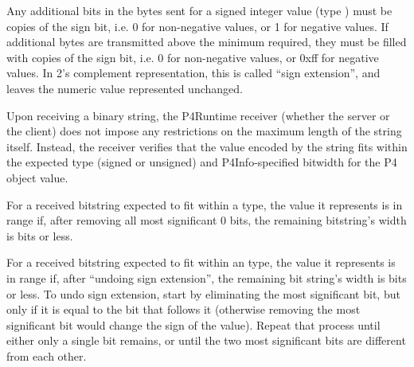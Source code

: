 \documentclass[11pt]{article}
\begin{document}
{%
Any additional bits in the bytes sent for a signed integer value (type )
must be copies of the sign bit, i.e. 0 for non-negative values, or 1 for
negative values. If additional bytes are transmitted above the
 minimum required, they must be filled with copies of the
sign bit, i.e. 0 for non-negative values, or 0xff for negative values. In 2's
complement representation, this is called \textquotedblleft{}sign extension\textquotedblright{}, and leaves the
numeric value represented unchanged.%

Upon receiving a binary string, the P4Runtime receiver (whether the server or
the client) does not impose any restrictions on the maximum length of the string
itself. Instead, the receiver verifies that the value encoded by the string fits
within the expected type (signed or unsigned) and P4Info-specified bitwidth for
the P4 object value.%

For a received bitstring expected to fit within a  type, the value it
represents is in range if, after removing all most significant 0 bits, the
remaining bitstring's width is  bits or less.%

For a received bitstring expected to fit within an  type, the value it
represents is in range if, after \textquotedblleft{}undoing sign extension\textquotedblright{}, the remaining bit
string's width is  bits or less. To undo sign extension, start by eliminating
the most significant bit, but only if it is equal to the bit that follows it
(otherwise removing the most significant bit would change the sign of the
value). Repeat that process until either only a single bit remains, or until the
two most significant bits are different from each other.%

}
\end{document}

